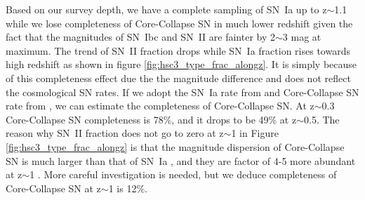 \documentclass[proof]{pasj01}
\begin{document}
Based on our survey depth, we have a complete sampling of SN~Ia up to z$\sim$1.1 while we lose completeness of Core-Collapse SN in much lower redshift given the fact that the magnitudes of SN~Ibc and SN~II are fainter by 2$\sim$3 mag at maximum.
The trend of SN~II fraction drops while SN~Ia fraction rises towards high redshift as shown in figure \ref{fig:hsc3_type_frac_alongz}. 
It is simply because of this completeness effect due the the magnitude difference and does not reflect the cosmological SN rates.
If we adopt the SN~Ia rate from \citet{graur14a} and Core-Collapse SN rate from \citet{strolger15a}, we can estimate the completeness of Core-Collapse SN. 
At z$\sim$0.3 Core-Collapse SN completeness is 78\%, and it drops to be 49\% at z$\sim$0.5. 
The reason why SN~II fraction does not go to zero at z$\sim$1 in Figure \ref{fig:hsc3_type_frac_alongz} is that the magnitude dispersion of Core-Collapse SN \citep[$\sigma$ $\sim$ 1.2 mag]{li11a,kessler19b} is much larger than that of SN~Ia \citep[$\sigma$ $\sim$ 0.5 mag]{rubin15a}, and they are factor of 4-5 more abundant at z$\sim$1 \citep{madau98a,hounsell18a}. 
More careful investigation is needed, but we deduce completeness %
of Core-Collapse SN at z$\sim$1 is 12\%.

%
%
%
\end{document}
